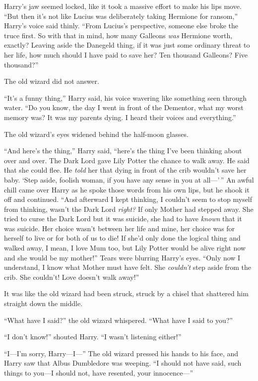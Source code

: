 Harry's jaw seemed locked, like it took a massive effort to make his
lips move. ``But then it's not like Lucius was deliberately taking
Hermione for ransom,'' Harry's voice said thinly. ``From Lucius's
perspective, someone else broke the truce first. So with that in mind,
how many Galleons \emph{was} Hermione worth, exactly? Leaving aside the
Danegeld thing, if it was just some ordinary threat to her life, how
much should I have paid to save her? Ten thousand Galleons? Five
thousand?''

The old wizard did not answer.

``It's a funny thing,'' Harry said, his voice wavering like something
seen through water. ``Do you know, the day I went in front of the
Dementor, what my worst memory was? It was my parents dying. I heard
their voices and everything.''

The old wizard's eyes widened behind the half-moon glasses.

``And here's the thing,'' Harry said, ``here's the thing I've been
thinking about over and over. The Dark Lord gave Lily Potter the chance
to walk away. He said that she could flee. He \emph{told} her that dying
in front of the crib wouldn't save her baby. `Step aside, foolish woman,
if you have any sense in you at all---'\,'' An awful chill came over
Harry as he spoke those words from his own lips, but he shook it off and
continued. ``And afterward I kept thinking, I couldn't seem to stop
myself from thinking, wasn't the Dark Lord \emph{right?} If only Mother
had stepped away. She tried to curse the Dark Lord but it was suicide,
she had to have \emph{known} that it was suicide. Her choice wasn't
between her life and mine, her choice was for herself to live or for
both of us to die! If she'd only done the logical thing and walked away,
I mean, I love Mum too, but Lily Potter would be alive right now and she
would be my mother!'' Tears were blurring Harry's eyes. ``Only now I
understand, I know what Mother must have felt. She \emph{couldn't} step
aside from the crib. She couldn't! Love doesn't walk away!''

It was like the old wizard had been struck, struck by a chisel that
shattered him straight down the middle.

``What have I said?'' the old wizard whispered. ``What have I said to
you?''

``I don't know!'' shouted Harry. ``I wasn't listening either!''

``I---I'm sorry, Harry---I---'' The old wizard pressed his hands to his
face, and Harry saw that Albus Dumbledore was weeping. ``I should not
have said, such things to you---I should not, have resented, your
innocence---''

